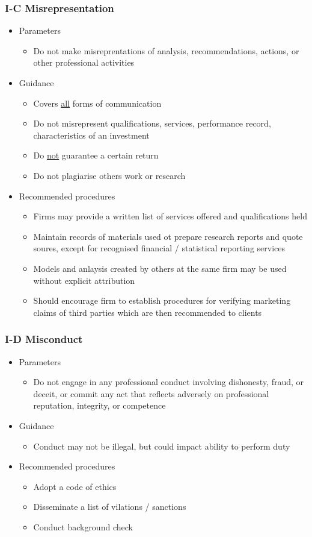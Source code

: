 \documentclass[../notes_compiled.tex]{subfiles}
\begin{document}
\subsubsection{I-C Misrepresentation}
\begin{itemize}
\item Parameters
\begin{itemize}
\item Do not make misreprentations of analysis, recommendations, actions, or other professional activities
\end{itemize}
\item Guidance
\begin{itemize}
\item Covers \underline{all} forms of communication
\item Do not misrepresent qualifications, services, performance record, characteristics of an investment
\item Do \underline{not} guarantee a certain return
\item Do not plagiarise others work or research
\end{itemize}
\item Recommended procedures
\begin{itemize}
\item Firms may provide a written list of services offered and qualifications held
\item Maintain records of materials used ot prepare research reports and quote soures, except for recognised financial / statistical reporting services
\item Models and anlaysis created by others at the same firm may be used without explicit attribution
\item Should encourage firm to establish procedures for verifying marketing claims of third parties which are then recommended to clients
\end{itemize}
\end{itemize}
\subsubsection{I-D Misconduct}
\begin{itemize}
\item Parameters
\begin{itemize}
\item Do not engage in any professional conduct involving dishonesty, fraud, or deceit, or commit any act that reflects adversely on professional reputation, integrity, or competence
\end{itemize}
\item Guidance
\begin{itemize}
\item Conduct may not be illegal, but could impact ability to perform duty
\end{itemize}
\item Recommended procedures
\begin{itemize}
\item Adopt a code of ethics
\item Disseminate a list of vilations / sanctions
\item Conduct  background check
\end{itemize}
\end{itemize}
\end{document}
